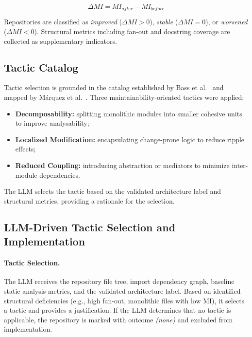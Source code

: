 \documentclass[sigconf,review,anonymous]{acmart}
\begin{document}
\begin{equation}
\Delta MI = MI_{after} - MI_{before}
\end{equation}

Repositories are classified as \textit{improved} ($\Delta MI > 0$), \textit{stable} ($\Delta MI = 0$), or \textit{worsened} ($\Delta MI < 0$). Structural metrics including fan-out and docstring coverage are collected as supplementary indicators.

\subsection{Tactic Catalog}

Tactic selection is grounded in the catalog established by Bass et al.~\cite{bass2021software} and mapped by M\'arquez et al.~\cite{marquez2022architectural}. Three maintainability-oriented tactics were applied:

\begin{itemize}[nosep]
    \item \textbf{Decomposability:} splitting monolithic modules into smaller cohesive units to improve analysability;
    \item \textbf{Localized Modification:} encapsulating change-prone logic to reduce ripple effects;
    \item \textbf{Reduced Coupling:} introducing abstraction or mediators to minimize inter-module dependencies.
\end{itemize}

The LLM selects the tactic based on the validated architecture label and structural metrics, providing a rationale for the selection.

\subsection{LLM-Driven Tactic Selection and Implementation}

\paragraph{Tactic Selection.} The LLM receives the repository file tree, import dependency graph, baseline static analysis metrics, and the validated architecture label. Based on identified structural deficiencies (e.g., high fan-out, monolithic files with low MI), it selects a tactic and provides a justification. If the LLM determines that no tactic is applicable, the repository is marked with outcome \textit{(none)} and excluded from implementation.
\end{document}
